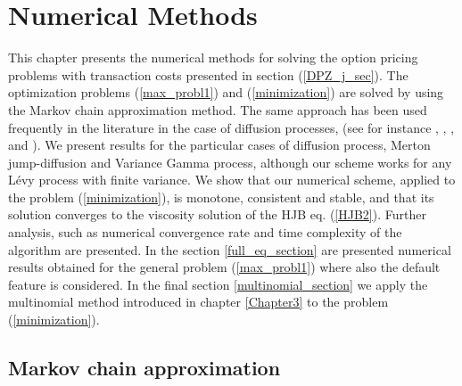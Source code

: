 

\chapter{Numerical Methods}\label{Chapter6}
\minitoc%

\vspace{5em}


This chapter presents the numerical methods for solving the option pricing problems with transaction costs presented in section (\ref{DPZ_j_sec}).
The optimization problems (\ref{max_probl1}) and (\ref{minimization}) are solved by using the Markov chain approximation method. The same approach has been used 
frequently in the literature in the case of diffusion processes, (see for instance \cite{HoNe89}, \cite{DaPaZa93}, \cite{Damgaard}, \cite{Mon04} and \cite{Pal15}). 
We present results for the particular cases of diffusion process, Merton jump-diffusion and Variance Gamma process, although our scheme works for any Lévy process with finite variance. 
We show that our numerical scheme, applied to the problem (\ref{minimization}), is monotone, consistent and stable, and that its solution converges to the viscosity solution of the  
HJB eq. (\ref{HJB2}).
Further analysis, such as numerical convergence rate and time complexity of the algorithm are presented.
In the section \ref{full_eq_section} are presented numerical results obtained for the general problem (\ref{max_probl1}) where also the default feature is considered.
In the final section \ref{multinomial_section} we apply the multinomial method introduced in chapter \ref{Chapter3} to the problem (\ref{minimization}).




\section{Markov chain approximation} \label{MC_section}

